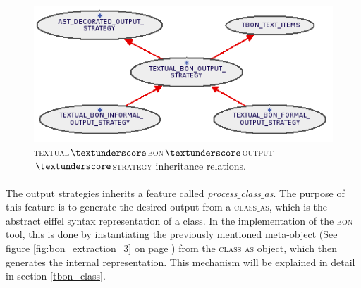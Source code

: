 \begin{figure}[h]
\centerline{
\includegraphics[scale=0.7]{images/bon-extraction-output-strategy.png}
}
\caption{\textsc{textual$\textunderscore$bon$\textunderscore$output$\textunderscore$strategy} inheritance relations.}
\label{fig:bon-extraction-output-strategy}
\end{figure}

\paragraph{}
The output strategies inherits a feature called \textit{process$\_$class$\_$as}. The purpose of this feature is to generate the desired output from a \textsc{class$\_$as}, which is the abstract eiffel syntax representation of a class. In the implementation of the \textsc{bon} tool, this is done by instantiating the previously mentioned meta-object (See figure \ref{fig:bon_extraction_3} on page \pageref{fig:bon_extraction_3}) from the \textsc{class$\_$as} object, which then generates the internal representation. This mechanism will be explained in detail in section \ref{tbon_class}.

